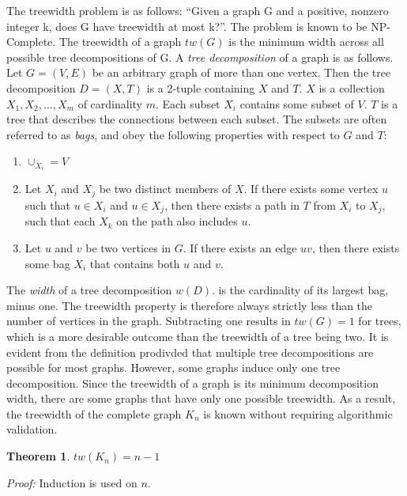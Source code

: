 \documentclass[12pt,conference]{IEEEtran}
\theoremstyle{plain}
\newtheorem{theorem}{Theorem}
\begin{document}
The treewidth problem is as follows: ``Given a graph G and a positive, nonzero integer k, does G have treewidth at most k?''. The problem is known to be NP-Complete. The treewidth of a graph $tw(G)$ is the minimum width across all possible tree decompositions of G. A \textit{tree decomposition} of a graph is as follows. Let $G=(V,E)$ be an arbitrary graph of more than one vertex. Then the tree decomposition $D = (X,T)$ is a 2-tuple containing $X$ and $T$. $X$ is a collection $X_{1}, X_{2}, ..., X_{m}$ of cardinality $m$. Each subset $X_{i}$ contains some subset of $V$. $T$ is a tree that describes the connections between each subset. The subsets are often referred to as \textit{bags}, and obey the following properties with respect to $G$ and $T$:

\begin{enumerate}
\item $\cup_{X_{i}} = V$
\item Let $X_{i}$ and $X_{j}$ be two distinct members of $X$. If there exists some vertex $u$ such that $u \in X_{i}$ and $u \in X_{j}$, then there exists a path in $T$ from $X_{i}$ to $X_{j}$, such that each $X_{k}$ on the path also includes $u$.
\item Let $u$ and $v$ be two vertices in $G$. If there exists an edge $uv$, then there exists some bag $X_{i}$ that contains both $u$ and $v$.
\end{enumerate}

The \textit{width} of a tree decomposition $w(D)$. is the cardinality of its largest bag, minus one. The treewidth property is therefore always strictly less than the number of vertices in the graph. Subtracting one results in $tw(G)=1$ for trees, which is a more desirable outcome than the treewidth of a tree being two. It is evident from the definition prodivded that multiple tree decompositions are possible for most graphs. However, some graphs induce only one tree decomposition. Since the treewidth of a graph is its minimum decomposition width, there are some graphs that have only one possible treewidth. As a result, the treewidth of the complete graph $K_{n}$ is known without requiring algorithmic validation.

\begin{theorem}
  $tw(K_{n}) = n-1$
\end{theorem}

\textit{Proof:} Induction is used on $n$. 
\end{document}
